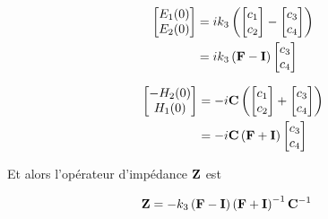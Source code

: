 \begin{align}
    \begin{bmatrix}
        E_1(0)\\
        E_2(0)\\
    \end{bmatrix}
    &=ik_3\left(
    \begin{bmatrix}
        c_1 \\
        c_2
    \end{bmatrix}
    -
    \begin{bmatrix}
        c_3 \\
        c_4
    \end{bmatrix}
    \right)\\
    &=ik_3\left(\mathbf{F} - \mathbf{I} \right)
    \begin{bmatrix}
        c_3 \\
        c_4
    \end{bmatrix}
\end{align}

\begin{align}
    \begin{bmatrix}
        -H_2(0)\\
        H_1(0)\\
    \end{bmatrix}
    &=-i
    \mathbf{C}
    \left(
        \begin{bmatrix}
            c_1 \\
            c_2
        \end{bmatrix}
        +
        \begin{bmatrix}
            c_3 \\
            c_4
        \end{bmatrix}
    \right)
    \\
    &=-i\mathbf{C} \left(  \mathbf{F} + \mathbf{I}  \right)
    \begin{bmatrix}
            c_3 \\
            c_4
    \end{bmatrix}
\end{align}

Et alors l'opérateur d'impédance $\mathbf{Z}$ est

\begin{align}
    \mathbf{Z}
    &=-k_3\left(\mathbf{F} - \mathbf{I} \right)\left(\mathbf{F}+ \mathbf{I} \right)^{-1}\mathbf{C}^{-1}
\end{align}


